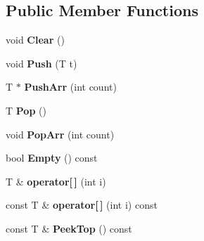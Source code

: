 \subsection*{Public Member Functions}
\begin{DoxyCompactItemize}
\item 
void {\bfseries Clear} ()\hypertarget{classtinyxml2_1_1DynArray_af87a804cd831226d069274b44b74b8bc}{}\label{classtinyxml2_1_1DynArray_af87a804cd831226d069274b44b74b8bc}

\item 
void {\bfseries Push} (T t)\hypertarget{classtinyxml2_1_1DynArray_aea7ffe983b5d3284bd43171afd7c99d0}{}\label{classtinyxml2_1_1DynArray_aea7ffe983b5d3284bd43171afd7c99d0}

\item 
T $\ast$ {\bfseries Push\+Arr} (int count)\hypertarget{classtinyxml2_1_1DynArray_ad289abee8cd02b26e215f1b63d2043f1}{}\label{classtinyxml2_1_1DynArray_ad289abee8cd02b26e215f1b63d2043f1}

\item 
T {\bfseries Pop} ()\hypertarget{classtinyxml2_1_1DynArray_a27a3f2f6f869815b6eabb3ea40cf0712}{}\label{classtinyxml2_1_1DynArray_a27a3f2f6f869815b6eabb3ea40cf0712}

\item 
void {\bfseries Pop\+Arr} (int count)\hypertarget{classtinyxml2_1_1DynArray_ab8b8c94a2312ab27e2846f0d61ef677a}{}\label{classtinyxml2_1_1DynArray_ab8b8c94a2312ab27e2846f0d61ef677a}

\item 
bool {\bfseries Empty} () const \hypertarget{classtinyxml2_1_1DynArray_a1c6766bdf61c2d3c2b95dab146ab48b9}{}\label{classtinyxml2_1_1DynArray_a1c6766bdf61c2d3c2b95dab146ab48b9}

\item 
T \& {\bfseries operator\mbox{[}$\,$\mbox{]}} (int i)\hypertarget{classtinyxml2_1_1DynArray_a756cf4e7464c711aa720e2b17a251daa}{}\label{classtinyxml2_1_1DynArray_a756cf4e7464c711aa720e2b17a251daa}

\item 
const T \& {\bfseries operator\mbox{[}$\,$\mbox{]}} (int i) const \hypertarget{classtinyxml2_1_1DynArray_ac97d6ddabbcdb098f155e7fc11ea5d91}{}\label{classtinyxml2_1_1DynArray_ac97d6ddabbcdb098f155e7fc11ea5d91}

\item 
const T \& {\bfseries Peek\+Top} () const \hypertarget{classtinyxml2_1_1DynArray_a5658d49c056707f14b089b53c358eb11}{}\label{classtinyxml2_1_1DynArray_a5658d49c056707f14b089b53c358eb11}


\end{DoxyCompactItemize}
